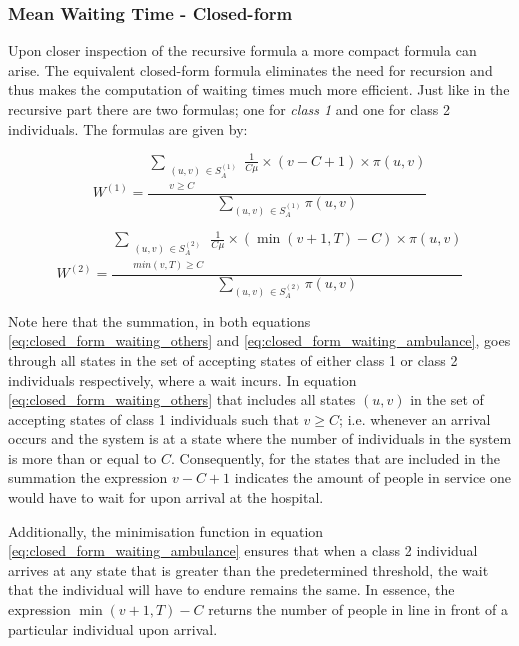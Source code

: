 \subsubsection{Mean Waiting Time - Closed-form}
Upon closer inspection of the recursive formula a more compact formula can arise. 
The equivalent closed-form formula eliminates the need for recursion and thus makes 
the computation of waiting times much more efficient. 
Just like in the recursive part there are two formulas; one for \textit{class 1} 
and one for class 2 individuals. 
The formulas are given by:

\begin{equation} \label{eq:closed_form_waiting_others}
    W^{(1)} = \frac{\sum_{\substack{(u,v) \, \in S_A^{(1)} \\ v \geq C}} 
    \frac{1}{C \mu} \times (v-C+1) \times \pi(u,v)}{\sum_{(u,v) \, 
    \in S_A^{(1)}} \pi(u,v)}
\end{equation}
    
\begin{equation}\label{eq:closed_form_waiting_ambulance}
    W^{(2)} = \frac{\sum_{\substack{(u,v) \, \in S_A^{(2)} \\ min(v,T) \geq C}} 
    \frac{1}{C \mu} \times (\min(v+1,T)-C) \times \pi(u,v)}{\sum_{(u,v) \, 
    \in S_A^{(2)}} \pi(u,v)}
\end{equation}

Note here that the summation, in both equations \ref{eq:closed_form_waiting_others} 
and \ref{eq:closed_form_waiting_ambulance}, goes through all states in the set of 
accepting 
states of either class 1 or class 2 individuals respectively, where a wait 
incurs. 
In equation \ref{eq:closed_form_waiting_others} that includes all states \((u,v)\) 
in the set of accepting states of class 1 individuals such that \( v \geq C\); i.e. 
whenever an arrival occurs and the system is at a state where the number of individuals 
in the system is more than or equal to $C$. 
Consequently, for the states that are included in the summation the expression 
\( v-C+1 \) indicates the amount of people in service one would have to wait for 
upon arrival at the hospital.

Additionally, the minimisation function in equation 
\ref{eq:closed_form_waiting_ambulance} 
ensures that when a class 2 individual arrives at any state 
that is greater than the predetermined threshold, the wait that the individual will 
have to endure remains the same. 
In essence, the expression \(\min(v+1,T) - C\) returns the number of people in line 
in front of a particular individual upon arrival.


